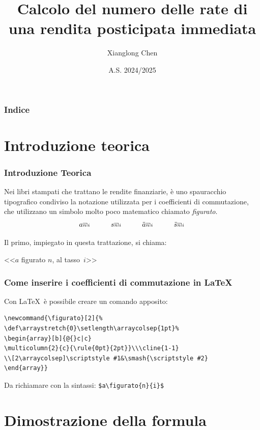 \documentclass{beamer}
\title{\textbf{Calcolo del numero delle rate di una rendita posticipata immediata}}
\author{Xianglong Chen}
\date{A.S. 2024/2025}
\makeatletter
\newcommand{\figurato}[2]{%
\def\arraystretch{0}\setlength\arraycolsep{1pt}
    \begin{array}[b]{@{}c|c}
        \multicolumn{2}{c}{\rule{0pt}{2pt}}\\\cline{1-1}
        \\[2\arraycolsep]\scriptstyle #1&\smash{\scriptstyle #2}
    \end{array}
}
\makeatother
\begin{document}
\begin{frame}
    \titlepage
\end{frame}

\begin{frame}
    \frametitle{Indice}
    \tableofcontents
\end{frame}

\section{Introduzione teorica}

\begin{frame}
    \frametitle{Introduzione Teorica}
    Nei libri stampati che trattano le rendite finanziarie, è uno spauracchio tipografico condiviso la notazione utilizzata per i coefficienti di commutazione, che utilizzano un simbolo molto poco matematico chiamato \emph{figurato}.
    \[
         a\figurato{n}{i} \hspace{1cm} s\figurato{n}{i} \hspace{1cm} \ddot{a}\figurato{n}{i}  \hspace{1cm} \ddot{s}\figurato{n}{i} 
    \]

    Il primo, impiegato in questa trattazione, si chiama:
    \begin{center}
        <<$a$ figurato $n$, al tasso~$i$>>
    \end{center}
    
\end{frame}

\begin{frame}[fragile]
    \frametitle{Come inserire i coefficienti di commutazione in \LaTeX}

    Con \LaTeX\ è possibile creare un comando apposito:

    \begin{verbatim}
\newcommand{\figurato}[2]{%
\def\arraystretch{0}\setlength\arraycolsep{1pt}%
\begin{array}[b]{@{}c|c}
\multicolumn{2}{c}{\rule{0pt}{2pt}}\\\cline{1-1}
\\[2\arraycolsep]\scriptstyle #1&\smash{\scriptstyle #2}
\end{array}}
    \end{verbatim}

    Da richiamare con la sintassi: \verb|$a\figurato{n}{i}$|
\end{frame}

\section{Dimostrazione della formula}
\end{document}
